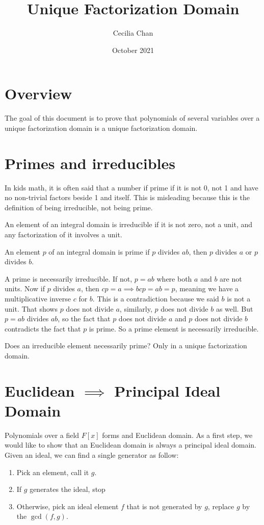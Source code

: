 \documentclass{article}
\title{Unique Factorization Domain}
\author{Cecilia Chan}
\date{October 2021}
\begin{document}
\maketitle
\section*{Overview}
The goal of this document is to prove that polynomials of several variables over a unique factorization domain is a unique factorization domain.

\section{Primes and irreducibles}
In kids math, it is often said that a number if prime if it is not 0, not 1 and have no non-trivial factors beside 1 and itself. This is misleading because this is the definition of being irreducible, not being prime.

An element of an integral domain is irreducible if it is not zero, not a unit, and any factorization of it involves a unit.

An element $ p $ of an integral domain is prime if $ p $ divides $ ab $, then $ p $ divides $ a $ or $ p $ divides $ b $.

A prime is necessarily irreducible. If not, $ p = ab $ where both $ a $ and $ b $ are not units. Now if $ p $ divides $ a $, then $ cp = a \implies bcp = ab = p $, meaning we have a multiplicative inverse $ c $ for $ b $. This is a contradiction because we said $ b $ is not a unit. That shows $ p $ does not divide $ a $, similarly, $ p $ does not divide $ b $ as well. But $ p = ab $ divides $ ab $, so the fact that $ p $ does not divide $ a $ and $ p $ does not divide $ b $ contradicts the fact that $ p $ is prime. So a prime element is necessarily irreducible.

Does an irreducible element necessarily prime? Only in a unique factorization domain.

\section{Euclidean $ \implies $ Principal Ideal Domain}
Polynomials over a field $ F[x] $ forms and Euclidean domain. As a first step, we would like to show that an Euclidean domain is always a principal ideal domain. Given an ideal, we can find a single generator as follow:

\begin{enumerate}
    \item Pick an element, call it $ g $.
    \item If $ g $ generates the ideal, stop
    \item Otherwise, pick an ideal element $ f $ that is not generated by $ g $, replace $ g $ by the $ \gcd(f, g) $. 
\end{enumerate}
\end{document}
